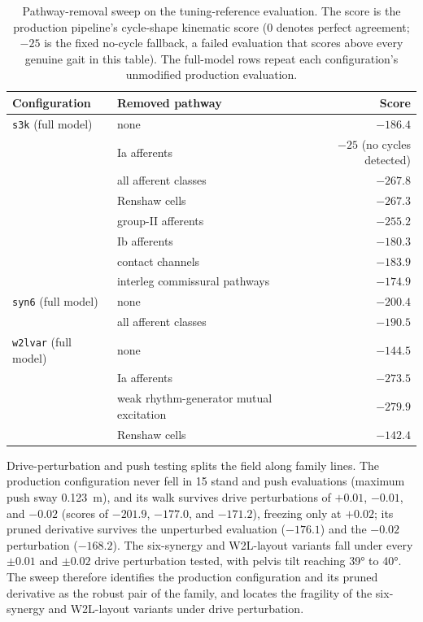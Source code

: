 \begin{table}[htbp]
\caption{Pathway-removal sweep on the tuning-reference evaluation. The score is the production pipeline's cycle-shape kinematic score (0 denotes perfect agreement; $-25$ is the fixed no-cycle fallback, a failed evaluation that scores above every genuine gait in this table). The full-model rows repeat each configuration's unmodified production evaluation.}
\label{tab:walker_ablations}
\begin{tabular}{@{}llr@{}}
\toprule
\textbf{Configuration} & \textbf{Removed pathway} & \textbf{Score} \\
\midrule
\texttt{s3k} (full model) & none & $-186.4$ \\
 & Ia afferents & $-25$ (no cycles detected) \\
 & all afferent classes & $-267.8$ \\
 & Renshaw cells & $-267.3$ \\
 & group-II afferents & $-255.2$ \\
 & Ib afferents & $-180.3$ \\
 & contact channels & $-183.9$ \\
 & interleg commissural pathways & $-174.9$ \\
\addlinespace
\texttt{syn6} (full model) & none & $-200.4$ \\
 & all afferent classes & $-190.5$ \\
\addlinespace
\texttt{w2lvar} (full model) & none & $-144.5$ \\
 & Ia afferents & $-273.5$ \\
 & weak rhythm-generator mutual excitation & $-279.9$ \\
 & Renshaw cells & $-142.4$ \\
\bottomrule
\end{tabular}
\end{table}

Drive-perturbation and push testing splits the field along family lines. The production configuration never fell in 15 stand and push evaluations (maximum push sway \qty{0.123}{\meter}), and its walk survives drive perturbations of $+0.01$, $-0.01$, and $-0.02$ (scores of $-201.9$, $-177.0$, and $-171.2$), freezing only at $+0.02$; its pruned derivative survives the unperturbed evaluation ($-176.1$) and the $-0.02$ perturbation ($-168.2$). The six-synergy and W2L-layout variants fall under every $\pm 0.01$ and $\pm 0.02$ drive perturbation tested, with pelvis tilt reaching \ang{39} to \ang{40}. The sweep therefore identifies the production configuration and its pruned derivative as the robust pair of the family, and locates the fragility of the six-synergy and W2L-layout variants under drive perturbation.

